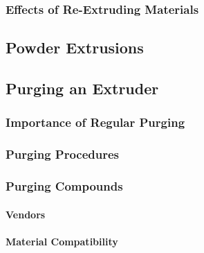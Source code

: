 \subsubsection{Effects of Re-Extruding Materials\label{sec:literatureReview:extrusion:regrind:effects}}

\subsection{Powder Extrusions\label{sec:literatureReview:extrusion:powder}}

\subsection{Purging an Extruder\label{sec:literatureReview:extrusion:purging}}

\subsubsection{Importance of Regular Purging\label{sec:literatureReview:extrusion:purging:importance}}

\subsubsection{Purging Procedures\label{sec:literatureReview:extrusion:purging:procedures}}

\subsubsection{Purging Compounds\label{sec:literatureReview:extrusion:purging:compounds}}

\paragraph*{Vendors}

\paragraph*{Material Compatibility}
